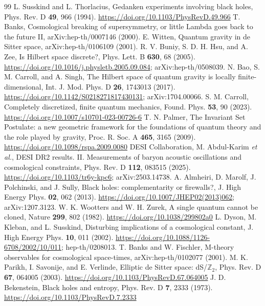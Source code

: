 \documentclass[aps,prd,twocolumn,superscriptaddress,nofootinbib]{revtex4-2}
\begin{document}
\begin{thebibliography}{99}
 L. Susskind and L. Thorlacius, Gedanken experiments involving black holes, Phys. Rev. D \textbf{49}, 966 (1994). \url{https://doi.org/10.1103/PhysRevD.49.966}
 T. Banks, Cosmological breaking of supersymmetry, or little Lambda goes back to the future II, arXiv:hep-th/0007146 (2000).
 E. Witten, Quantum gravity in de Sitter space, arXiv:hep-th/0106109 (2001).
 R. V. Buniy, S. D. H. Hsu, and A. Zee, Is Hilbert space discrete?, Phys. Lett. B \textbf{630}, 68 (2005). \url{https://doi.org/10.1016/j.physletb.2005.09.084}; arXiv:hep-th/0508039.
 N. Bao, S. M. Carroll, and A. Singh, The Hilbert space of quantum gravity is locally finite-dimensional, Int. J. Mod. Phys. D \textbf{26}, 1743013 (2017). \url{https://doi.org/10.1142/S0218271817430131}; arXiv:1704.00066.
 S. M. Carroll, Completely discretized, finite quantum mechanics, Found. Phys. \textbf{53}, 90 (2023). \url{https://doi.org/10.1007/s10701-023-00726-6}
 T. N. Palmer, The Invariant Set Postulate: a new geometric framework for the foundations of quantum theory and the role played by gravity, Proc. R. Soc. A \textbf{465}, 3165 (2009). \url{https://doi.org/10.1098/rspa.2009.0080}
 DESI Collaboration, M. Abdul-Karim \emph{et al.}, DESI DR2 results. II. Measurements of baryon acoustic oscillations and cosmological constraints, Phys. Rev. D \textbf{112}, 083515 (2025). \url{https://doi.org/10.1103/tr6y-kpc6}; arXiv:2503.14738.
 A. Almheiri, D. Marolf, J. Polchinski, and J. Sully, Black holes: complementarity or firewalls?, J. High Energy Phys. \textbf{02}, 062 (2013). \url{https://doi.org/10.1007/JHEP02(2013)062}; arXiv:1207.3123.
 W. K. Wootters and W. H. Zurek, A single quantum cannot be cloned, Nature \textbf{299}, 802 (1982). \url{https://doi.org/10.1038/299802a0}
 L. Dyson, M. Kleban, and L. Susskind, Disturbing implications of a cosmological constant, J. High Energy Phys. \textbf{10}, 011 (2002). \url{https://doi.org/10.1088/1126-6708/2002/10/011}; hep-th/0208013.
 T. Banks and W. Fischler, M-theory observables for cosmological space-times, arXiv:hep-th/0102077 (2001).
 M. K. Parikh, I. Savonije, and E. Verlinde, Elliptic de Sitter space: dS/$\mathbb{Z}_2$, Phys. Rev. D \textbf{67}, 064005 (2003). \url{https://doi.org/10.1103/PhysRevD.67.064005}
 J. D. Bekenstein, Black holes and entropy, Phys. Rev. D \textbf{7}, 2333 (1973). \url{https://doi.org/10.1103/PhysRevD.7.2333}

\end{thebibliography}
\end{document}
